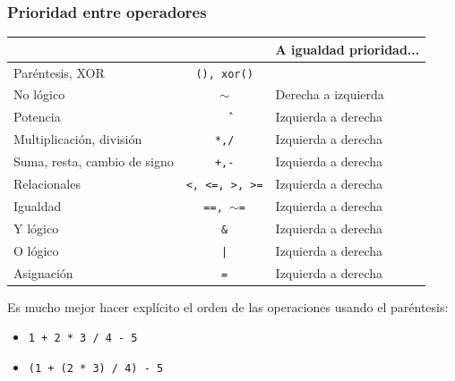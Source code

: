 \begin{frame}[label=oper_prioridad,shrink=5]
 \frametitle{Prioridad entre operadores}
 \begin{center}
 \begin{scriptsize}
  \begin{tabular}{|l|c|l|}
  \multicolumn{1}{c}{} & \multicolumn{1}{c}{} &
       \multicolumn{1}{c}{\textbf{A igualdad prioridad...}} \\
  \toprule \hline
  Paréntesis, XOR & \texttt{(), xor()} & \\ \hline
  No lógico & \texttt{$\sim$} & Derecha a izquierda \\ \hline
  Potencia & \texttt{\^\ } & Izquierda a derecha \\ \hline
  Multiplicación, división & \texttt{*,/} & Izquierda a derecha \\ \hline
  Suma, resta, cambio de signo & \texttt{+,-} & Izquierda a derecha \\ \hline
  Relacionales & \texttt{<, <=, >, >=} & Izquierda a derecha \\ \hline
  Igualdad & \texttt{==, $\sim$=} & Izquierda a derecha \\ \hline
  Y lógico & \texttt{\&} & Izquierda a derecha \\ \hline
  O lógico & \texttt{|} & Izquierda a derecha \\ \hline
  Asignación & \texttt{=} & Izquierda a derecha \\ \hline
  \end{tabular}
 \end{scriptsize}
 \end{center}
    Es mucho mejor hacer explícito el orden de las operaciones usando el
    paréntesis: 
  \begin{itemize}
    \item \texttt{1 + 2 * 3 / 4 - 5}
    \item \texttt{(1 + (2 * 3) / 4) - 5}            
  \end{itemize}
\end{frame}
